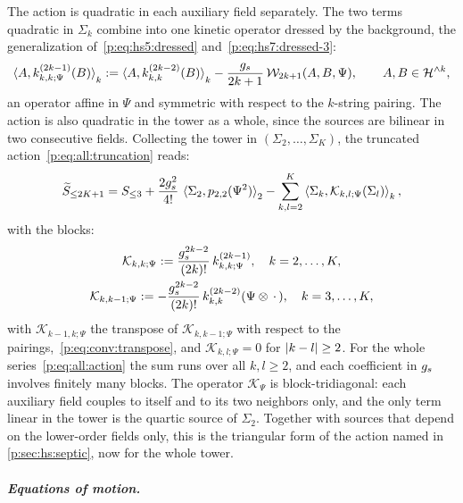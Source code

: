 The action is quadratic in each auxiliary field separately.
The two terms quadratic in $\Sigma_k$ combine into one kinetic operator dressed by the background, the generalization of~\eqref{p:eq:hs5:dressed} and~\eqref{p:eq:hs7:dressed-3}:
\begin{equation}
  \label{p:eq:all:dressed-odd}
  \pair[k]{A}{\kin{k}{\Psi}{2 k - 1}(B)}
    := \pair[k]{A}{\kin{k}{}{2 k - 2}(B)}
      - \frac{\gs}{2 k + 1} \, \dvertex{2 k + 1}(A, B, \Psi),
  \qquad
  A, B \in \Hn{k},
\end{equation}
an operator affine in $\Psi$ and symmetric with respect to the $k$-string pairing.
The action is also quadratic in the tower as a whole, since the sources are bilinear in two consecutive fields.
Collecting the tower in $(\Sigma_2, \ldots, \Sigma_K)$, the truncated action~\eqref{p:eq:all:truncation} reads:
\begin{equation}
  \label{p:eq:all:tridiagonal}
  \caction[\le 2 K + 1]
    = S_{\le 3}
      + \frac{2 \gs^2}{4!} \, \pair[2]{\Sigma_2}{\sprod{2}{2}(\Psi^2)}
      - \sum_{k, l = 2}^{K} \pair[k]{\Sigma_k}{\mathcal K_{k, l; \Psi}(\Sigma_l)},
\end{equation}
with the blocks:
\begin{equation}
  \label{p:eq:all:blocks}
  \begin{gathered}
    \mathcal K_{k, k; \Psi}
      := \frac{\gs^{2 k - 2}}{(2 k)!} \, \kin{k}{\Psi}{2 k - 1},
    \quad
    k = 2, \ldots, K,
    \\
    \mathcal K_{k, k - 1; \Psi}
      := - \frac{\gs^{2 k - 2}}{(2 k)!} \, \kin{k}{}{2 k - 2}(\Psi \otimes \, \cdot \,),
    \quad
    k = 3, \ldots, K,
  \end{gathered}
\end{equation}
with $\mathcal K_{k - 1, k; \Psi}$ the transpose of $\mathcal K_{k, k - 1; \Psi}$ with respect to the pairings,~\eqref{p:eq:conv:transpose}, and $\mathcal K_{k, l; \Psi} = 0$ for $\abs{k - l} \ge 2$.
For the whole series~\eqref{p:eq:all:action} the sum runs over all $k, l \ge 2$, and each coefficient in $\gs$ involves finitely many blocks.
The operator $\mathcal K_\Psi$ is block-tridiagonal: each auxiliary field couples to itself and to its two neighbors only, and the only term linear in the tower is the quartic source of $\Sigma_2$.
Together with sources that depend on the lower-order fields only, this is the triangular form of the action named in \cref{p:sec:hs:septic}, now for the whole tower.

\subparagraph{Equations of motion.}

